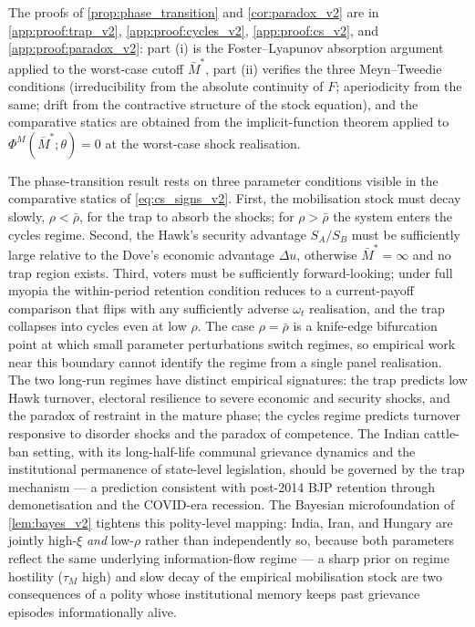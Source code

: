\documentclass[11pt,twoside]{extarticle}
\begin{document}
The proofs of \autoref{prop:phase_transition} and \autoref{cor:paradox_v2} are in \autoref{app:proof:trap_v2}, \autoref{app:proof:cycles_v2}, \autoref{app:proof:cs_v2}, and \autoref{app:proof:paradox_v2}: part (i) is the Foster–Lyapunov absorption argument applied to the worst-case cutoff $\bar M^*$, part (ii) verifies the three Meyn–Tweedie conditions (irreducibility from the absolute continuity of $F$; aperiodicity from the same; drift from the contractive structure of the stock equation), and the comparative statics are obtained from the implicit-function theorem applied to $\Phi^M(\bar M^*;\theta)=0$ at the worst-case shock realisation.

The phase-transition result rests on three parameter conditions visible in the comparative statics of \autoref{eq:cs_signs_v2}.\label{sec:scope_v2} First, the mobilisation stock must decay slowly, $\rho<\bar\rho$, for the trap to absorb the shocks; for $\rho>\bar\rho$ the system enters the cycles regime. Second, the Hawk's security advantage $S_A/S_B$ must be sufficiently large relative to the Dove's economic advantage $\Delta u$, otherwise $\bar M^*=\infty$ and no trap region exists. Third, voters must be sufficiently forward-looking; under full myopia the within-period retention condition reduces to a current-payoff comparison that flips with any sufficiently adverse $\omega_t$ realisation, and the trap collapses into cycles even at low $\rho$. The case $\rho=\bar\rho$ is a knife-edge bifurcation point at which small parameter perturbations switch regimes, so empirical work near this boundary cannot identify the regime from a single panel realisation. The two long-run regimes have distinct empirical signatures: the trap predicts low Hawk turnover, electoral resilience to severe economic and security shocks, and the paradox of restraint in the mature phase; the cycles regime predicts turnover responsive to disorder shocks and the paradox of competence. The Indian cattle-ban setting, with its long-half-life communal grievance dynamics and the institutional permanence of state-level legislation, should be governed by the trap mechanism --- a prediction consistent with post-2014 BJP retention through demonetisation and the COVID-era recession. The Bayesian microfoundation of \autoref{lem:bayes_v2} tightens this polity-level mapping: India, Iran, and Hungary are jointly high-$\xi$ \emph{and} low-$\rho$ rather than independently so, because both parameters reflect the same underlying information-flow regime --- a sharp prior on regime hostility ($\tau_M$ high) and slow decay of the empirical mobilisation stock are two consequences of a polity whose institutional memory keeps past grievance episodes informationally alive.
\end{document}
